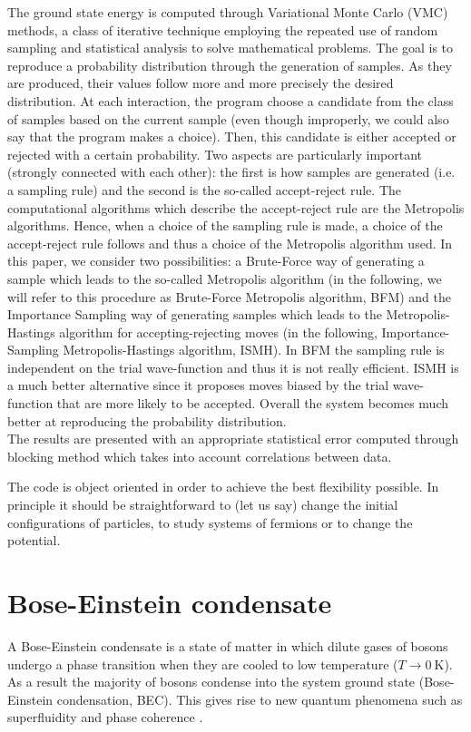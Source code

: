 The ground state energy is computed through Variational Monte Carlo (VMC) methods, a class of iterative technique employing the repeated use of random sampling and statistical analysis to solve mathematical problems. The goal is to reproduce a probability distribution through the generation of samples. As they are produced, their values follow more and more precisely the desired distribution. At each interaction, the program choose a candidate from the class of samples based on the current sample (even though improperly, we could also say that the program makes a choice). Then, this candidate is either accepted or rejected with a certain probability. Two aspects are particularly important (strongly connected with each other): the first is how samples are generated (i.e. a sampling rule) and the second is the so-called accept-reject rule. The computational algorithms which describe the accept-reject rule are the Metropolis algorithms. Hence, when a choice of the sampling rule is made, a choice of the accept-reject rule follows and thus a choice of the Metropolis algorithm used. In this paper, we consider two possibilities: a Brute-Force way of generating a sample which leads to the so-called Metropolis algorithm (in the following, we will refer to this procedure as Brute-Force Metropolis algorithm, BFM) and the Importance Sampling way of generating samples which leads to the Metropolis-Hastings algorithm for accepting-rejecting moves (in the following, Importance-Sampling Metropolis-Hastings algorithm, ISMH). In BFM the sampling rule is independent on the trial wave-function and thus it is not really efficient. ISMH is a much better alternative since it proposes moves biased by the trial wave-function that are more likely to be accepted.  Overall the system becomes much better at reproducing the probability distribution.\\

The results are presented with an appropriate statistical error computed through blocking method which takes into account correlations between data.

The code is object oriented in order to achieve the best flexibility possible. In principle it should be straightforward to (let us say) change the initial configurations of particles, to study systems of fermions or to change the potential.

\section{Bose-Einstein condensate}
A Bose-Einstein condensate is a state of matter in which dilute gases of bosons undergo a phase transition when they are cooled to low temperature ($T\rightarrow 0\ \si{\kelvin}$). As a result the majority of bosons condense into the system ground state (Bose-Einstein condensation, BEC). This gives rise to new quantum phenomena such as superfluidity and phase coherence \cite{Stringari}. 

